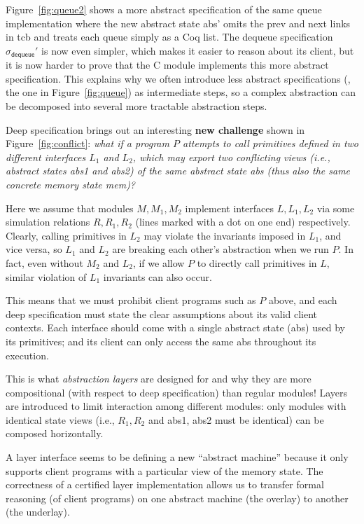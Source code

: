 Figure~\ref{fig:queue2} shows a more abstract specification of the same
queue implementation where the new abstract state \textsf{abs'} omits
the \textsf{prev} and \textsf{next} links in \textsf{tcb} and treats each
queue simply as a Coq list. The \textsf{dequeue} specification 
$\hat{\sigma}_\textsf{dequeue}'$ is now
even simpler, which makes it easier to reason about its client,
but it is now harder to prove that the C module
implements this more abstract specification.  This explains why we
often introduce less abstract specifications (\eg,
the one in Figure~\ref{fig:queue}) as intermediate steps, so a
complex abstraction can be decomposed into several more tractable
abstraction steps.

Deep specification brings out an interesting {\bf new challenge}
shown in Figure~\ref{fig:conflict}: {\em what if a program $P$ attempts to
call primitives defined in two different interfaces $L_1$ and $L_2$,
which may export two conflicting views (i.e., abstract states
\textsf{abs1} and \textsf{abs2}) of the same abstract state \textsf{abs}
(thus also the same concrete memory state \textsf{mem})?}

Here we assume that modules $M, M_1, M_2$ implement interfaces $L,
L_1, L_2$ via some simulation relations $R, R_1, R_2$ (lines marked
with a dot on one end) respectively. Clearly, calling primitives in
$L_2$ may violate the invariants imposed in $L_1$, and vice versa,
so $L_1$ and $L_2$ are breaking each other's abstraction when we run
$P$. In fact, even without $M_2$ and $L_2$, if we allow $P$ to
directly call primitives in $L$, similar violation of $L_1$ invariants
can also occur.

This means that we must prohibit client programs such as $P$ above,
and each deep specification must state the clear assumptions about its
valid client contexts. Each interface should come with a single
abstract state (\textsf{abs}) used by its primitives; and its client can
only access the same \textsf{abs} throughout its execution. 

This is what {\em abstraction layers} are designed for and why they
are more compositional (with respect to deep specification)
than regular modules! Layers are introduced to limit 
interaction among different modules: only modules with identical
state views (i.e., $R_1, R_2$ and \textsf{abs1},
\textsf{abs2} must be identical) can be composed horizontally.
 
A layer interface seems to be defining a new ``abstract machine''
because it only supports client programs with a particular view of the
memory state. The correctness of a certified layer implementation
allows us to transfer formal reasoning (of client programs) on one
abstract machine (the overlay) to another (the underlay).  

